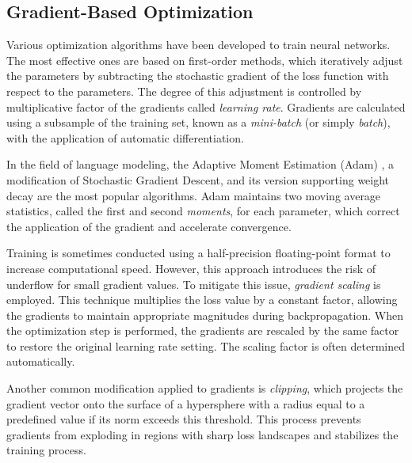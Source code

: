 \subsection{Gradient-Based Optimization}

Various optimization algorithms have been developed to train neural networks. The most effective ones are based on first-order methods, which iteratively adjust the parameters by subtracting the stochastic gradient of the loss function with respect to the parameters. The degree of this adjustment is controlled by multiplicative factor of the gradients called \textit{learning rate}. Gradients are calculated using a subsample of the training set, known as a \textit{mini-batch} (or simply \textit{batch}), with the application of automatic differentiation.

\begin{sloppypar}
In the field of language modeling, the Adaptive Moment Estimation (Adam) \parencite{kingma2014}, a modification of Stochastic Gradient Descent, and its version supporting weight decay \parencite{loshchilov2017} are the most popular algorithms. Adam maintains two moving average statistics, called the first and second \textit{moments}, for each parameter, which correct the application of the gradient and accelerate convergence.
\end{sloppypar}

\begin{sloppypar}
Training is sometimes conducted using a half-precision floating-point format to increase computational speed. However, this approach introduces the risk of underflow for small gradient values. To mitigate this issue, \textit{gradient scaling} is employed. This technique multiplies the loss value by a constant factor, allowing the gradients to maintain appropriate magnitudes during backpropagation. When the optimization step is performed, the gradients are rescaled by the same factor to restore the original learning rate setting. The scaling factor is often determined automatically. \parencite{nvidia2024}
\end{sloppypar}

\begin{sloppypar}
Another common modification applied to gradients is \textit{clipping}, which projects the gradient vector onto the surface of a hypersphere with a radius equal to a predefined value if its norm exceeds this threshold. This process prevents gradients from exploding in regions with sharp loss landscapes and stabilizes the training process. \parencite{pascanu2013}
\end{sloppypar}

